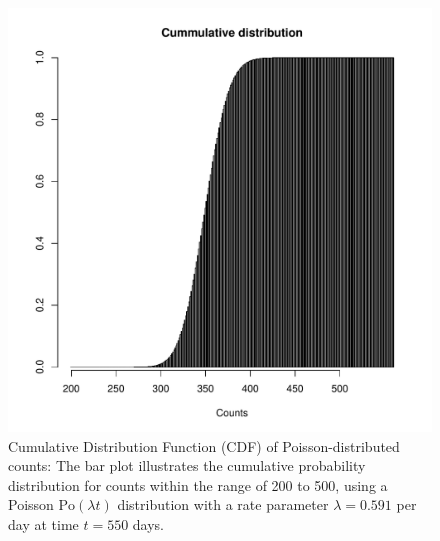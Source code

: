 \begin{figure}
\begin{knitrout}
\color{fgcolor}

{\centering \includegraphics[width=\textwidth-3cm]{figure/ch02_figunnamed-chunk-5-1} 

}


\end{knitrout}
  \caption{Cumulative Distribution Function (CDF) of Poisson-distributed counts: The bar plot illustrates the cumulative probability distribution for counts within the range of 200 to 500, using a Poisson $\textrm{Po}(\lambda t)$ distribution with a rate parameter $\lambda = 0.591$ per day at time $t=550$ days.}
  \label{fig:2_4}
\end{figure}


